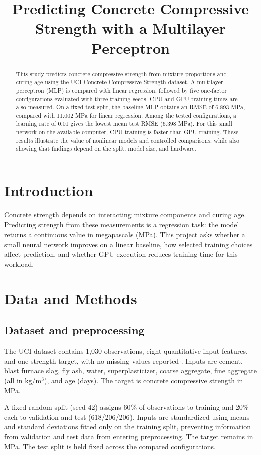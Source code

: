\documentclass[sigconf,nonacm]{acmart}
\title{Predicting Concrete Compressive Strength with a Multilayer Perceptron}
\begin{document}
\begin{abstract}
This study predicts concrete compressive strength from mixture proportions and curing age using the UCI Concrete Compressive Strength dataset. A multilayer perceptron (MLP) is compared with linear regression, followed by five one-factor configurations evaluated with three training seeds. CPU and GPU training times are also measured. On a fixed test split, the baseline MLP obtains an RMSE of 6.893 MPa, compared with 11.002 MPa for linear regression. Among the tested configurations, a learning rate of 0.01 gives the lowest mean test RMSE (6.398 MPa). For this small network on the available computer, CPU training is faster than GPU training. These results illustrate the value of nonlinear models and controlled comparisons, while also showing that findings depend on the split, model size, and hardware.
\end{abstract}

\maketitle

\section{Introduction}
Concrete strength depends on interacting mixture components and curing age. Predicting strength from these measurements is a regression task: the model returns a continuous value in megapascals (MPa). This project asks whether a small neural network improves on a linear baseline, how selected training choices affect prediction, and whether GPU execution reduces training time for this workload.

\section{Data and Methods}
\subsection{Dataset and preprocessing}
The UCI dataset contains 1,030 observations, eight quantitative input features, and one strength target, with no missing values reported \cite{uci,yeh}. Inputs are cement, blast furnace slag, fly ash, water, superplasticizer, coarse aggregate, fine aggregate (all in kg/m$^3$), and age (days). The target is concrete compressive strength in MPa.

A fixed random split (seed 42) assigns 60\% of observations to training and 20\% each to validation and test (618/206/206). Inputs are standardized using means and standard deviations fitted only on the training split, preventing information from validation and test data from entering preprocessing. The target remains in MPa. The test split is held fixed across the compared configurations.
\end{document}
